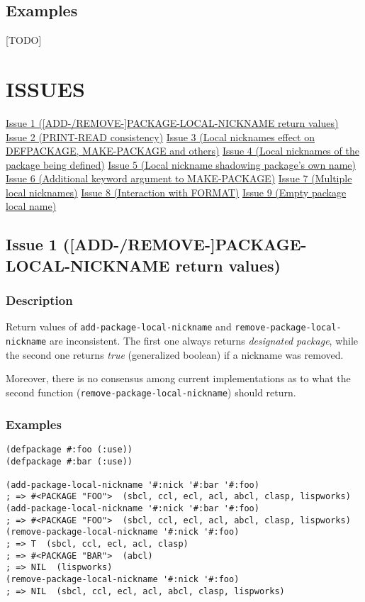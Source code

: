 \documentclass[11pt]{article}
\begin{document}
\subsection{Examples}
\label{sec:org64da27f}
[TODO]
\section{ISSUES}
\label{sec:org5ba2b5f}
\href{./issues/1.org}{Issue 1 ([ADD-/REMOVE-]PACKAGE-LOCAL-NICKNAME return values)}
\href{./issues/2.org}{Issue 2 (PRINT-READ consistency)}
\href{./issues/3.org}{Issue 3 (Local nicknames effect on DEFPACKAGE, MAKE-PACKAGE and others)}
\href{./issues/4.org}{Issue 4 (Local nicknames of the package being defined)}
\href{./issues/5.org}{Issue 5 (Local nickname shadowing package's own name)}
\href{./issues/6.org}{Issue 6 (Additional keyword argument to MAKE-PACKAGE)}
\href{./issues/7.org}{Issue 7 (Multiple local nicknames)}
\href{./issues/8.org}{Issue 8 (Interaction with FORMAT)}
\href{./issues/9.org}{Issue 9 (Empty package local name)}

\subsection{Issue 1 ([ADD-/REMOVE-]PACKAGE-LOCAL-NICKNAME return values)}
\label{sec:org6f1e9ed}
\subsubsection{Description}
\label{sec:org71cada1}
Return values of \texttt{add-package-local-nickname} and \texttt{remove-package-local-nickname}
are inconsistent. The first one always returns \emph{designated package}, while the
second one returns \emph{true} (generalized boolean) if a nickname was removed.

Moreover, there is no consensus among current implementations as to what the second
function (\texttt{remove-package-local-nickname}) should return.
\subsubsection{Examples}
\label{sec:org02f1b6f}
\begin{verbatim}
(defpackage #:foo (:use))
(defpackage #:bar (:use))

(add-package-local-nickname '#:nick '#:bar '#:foo)
; => #<PACKAGE "FOO">  (sbcl, ccl, ecl, acl, abcl, clasp, lispworks)
(add-package-local-nickname '#:nick '#:bar '#:foo)
; => #<PACKAGE "FOO">  (sbcl, ccl, ecl, acl, abcl, clasp, lispworks)
(remove-package-local-nickname '#:nick '#:foo)
; => T  (sbcl, ccl, ecl, acl, clasp)
; => #<PACKAGE "BAR">  (abcl)
; => NIL  (lispworks)
(remove-package-local-nickname '#:nick '#:foo)
; => NIL  (sbcl, ccl, ecl, acl, abcl, clasp, lispworks)
\end{verbatim}
\end{document}
